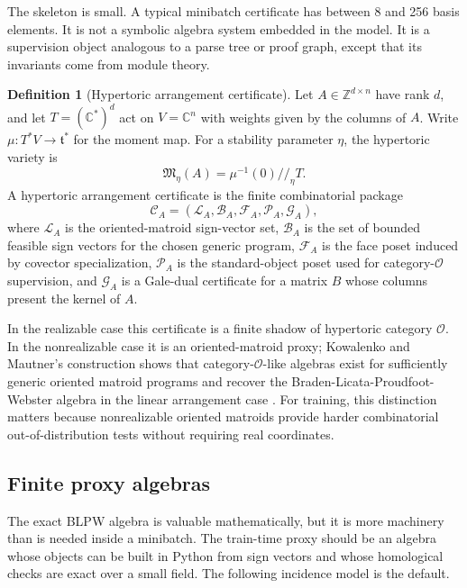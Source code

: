 \documentclass[11pt]{article}
\theoremstyle{definition}
\newtheorem{definition}{Definition}[section]
\theoremstyle{plain}
\theoremstyle{remark}
\numberwithin{equation}{section}
\newcommand{\C}{\mathbb{C}}
\newcommand{\Z}{\mathbb{Z}}
\begin{document}
The skeleton is small.  A typical minibatch certificate has between 8 and 256 basis elements.  It is not a symbolic algebra system embedded in the model.  It is a supervision object analogous to a parse tree or proof graph, except that its invariants come from module theory.

\begin{definition}[Hypertoric arrangement certificate]\label{def:hypertoric-certificate}
Let $A\in\Z^{d\times n}$ have rank $d$, and let $T=(\C^*)^d$ act on $V=\C^n$ with weights given by the columns of $A$.  Write $\mu:T^*V\to\mathfrak t^*$ for the moment map.  For a stability parameter $\eta$, the hypertoric variety is
\begin{equation}
  \mathfrak M_\eta(A)=\mu^{-1}(0) /
\!/_\eta T.
\end{equation}
A hypertoric arrangement certificate is the finite combinatorial package
\begin{equation}
  \mathcal C_A=(\mathcal L_A,\mathcal B_A,\mathcal F_A,\mathcal P_A,\mathcal G_A),
\end{equation}
where $\mathcal L_A$ is the oriented-matroid sign-vector set, $\mathcal B_A$ is the set of bounded feasible sign vectors for the chosen generic program, $\mathcal F_A$ is the face poset induced by covector specialization, $\mathcal P_A$ is the standard-object poset used for category-$\mathcal O$ supervision, and $\mathcal G_A$ is a Gale-dual certificate for a matrix $B$ whose columns present the kernel of $A$.
\end{definition}

In the realizable case this certificate is a finite shadow of hypertoric category $\mathcal O$.  In the nonrealizable case it is an oriented-matroid proxy; Kowalenko and Mautner's construction shows that category-$\mathcal O$-like algebras exist for sufficiently generic oriented matroid programs and recover the Braden-Licata-Proudfoot-Webster algebra in the linear arrangement case \cite{kowalenko2022oriented}.  For training, this distinction matters because nonrealizable oriented matroids provide harder combinatorial out-of-distribution tests without requiring real coordinates.

\subsection{Finite proxy algebras}

The exact BLPW algebra is valuable mathematically, but it is more machinery than is needed inside a minibatch.  The train-time proxy should be an algebra whose objects can be built in Python from sign vectors and whose homological checks are exact over a small field.  The following incidence model is the default.
\end{document}
